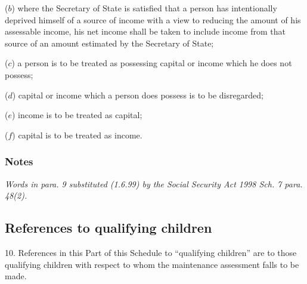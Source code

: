 \documentclass[a4paper]{article}
\newcommand\amendment[1]{\subsubsection*{Notes}{\itshape\frenchspacing\footnotesize #1 \par}}
\begin{document}
{\begin{enumerate}
($b$) where the Secretary of State is satisfied that a person has intentionally deprived himself of a source of income with a view to reducing the amount of his assessable income, his net income shall be taken to include income from that source of an amount estimated by the Secretary of State;

($c$) a person is to be treated as possessing capital or income which he does not possess;

($d$) capital or income which a person does possess is to be disregarded;

($e$) income is to be treated as capital;

($f$) capital is to be treated as income.
\end{enumerate}

\amendment{
Words in para. 9 substituted (1.6.99) by the Social Security Act 1998 Sch. 7 para. 48(2).
}

\subsection*{References to qualifying children}

10. References in this Part of this Schedule to “qualifying children” are to those qualifying children with respect to whom the maintenance assessment falls to be made.

}
\end{document}
